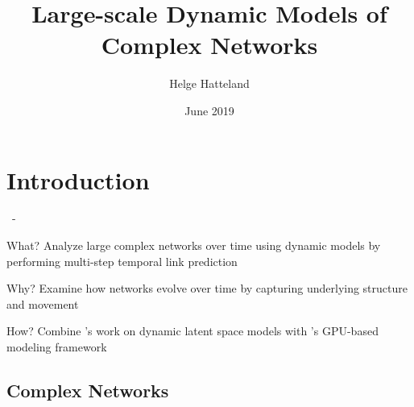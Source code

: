 \documentclass{beamer}
\title{Large-scale Dynamic Models of Complex Networks}
\author{Helge Hatteland}
\date{June 2019}
\newenvironment{xframe}
    {\begin{frame}{
        \ifx\insertsubsection\empty
            \strut
        \else\ifx\insertsubsubsection\empty
            \insertsection
        \else
            \insertsection~-~\insertsubsection
        \fi\fi
    }{
        \ifx\insertsubsection\empty
            \insertsection
        \else\ifx\insertsubsubsection\empty
            \insertsubsection
        \else
            \insertsubsubsection
        \fi\fi
    }}
    {\end{frame}}
\newenvironment{xblock}[1]
    {\begin{block}{#1}}
    {\end{block}}
\begin{document}
\frame{
	\maketitle
}

    
\section{Introduction}

    \begin{xframe}
        \begin{xblock}{What?}
            Analyze large complex networks over time using dynamic models by performing multi-step temporal link prediction
        \end{xblock}
        
        \begin{xblock}{Why?}
            Examine how networks evolve over time by capturing underlying structure and movement
        \end{xblock}
        
        \begin{xblock}{How?}
            Combine \citeauthor{zangenberg2018a}'s work \cite{zangenberg2018a} on dynamic latent space models with \citeauthor{jacobsen2018a}'s GPU-based modeling framework \cite{jacobsen2018a}
        \end{xblock}
        
    \end{xframe}
        
    \subsection{Complex Networks}
    
\end{document}
